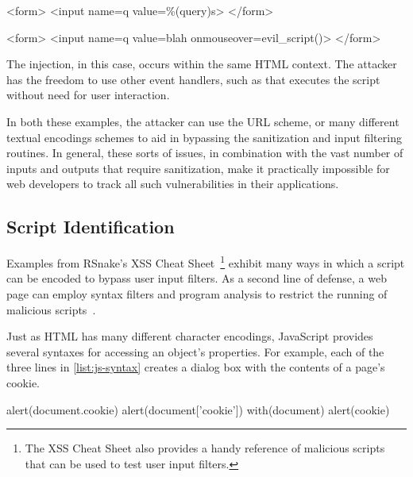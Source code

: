 \begin{description}
\begin{exploit-example}
  <form>
    <input name=q value=\%(query)s>
  </form>
\end{exploit-example}

\begin{exploit-example}
  <form>
    <input name=q value=blah onmouseover=evil_script()>
  </form>
\end{exploit-example}

  The injection, in this case, occurs within the same HTML context.
  The attacker has the freedom to use other event handlers, such as  that executes the script without need for user interaction.

\end{description}

In both these examples, the attacker can use the  URL scheme, or many different textual encodings schemes to aid in bypassing the sanitization and input filtering routines.
In general, these sorts of issues, in combination with the vast number of inputs and outputs that require sanitization, make it practically impossible for web developers to track all such vulnerabilities in their applications.

\subsection{Script Identification}

Examples from RSnake's XSS Cheat Sheet~\cite{xsscheatsheet}\footnote{The XSS Cheat Sheet also provides a handy reference of malicious scripts that can be used to test user input filters.} exhibit many ways in which a script can be encoded to bypass user input filters.
As a second line of defense, a web page can employ syntax filters and program analysis to restrict the running of malicious scripts~\cite{reis.etal+06, yu.etal+07, yaowen.etal+04}.

Just as HTML has many different character encodings, JavaScript provides several syntaxes for accessing an object's properties.
For example, each of the three lines in \autoref{list:js-syntax} creates a dialog box with the contents of a page's cookie.

\begin{jscode}
alert(document.cookie)
alert(document['cookie'])
with(document) alert(cookie)
\end{jscode}

